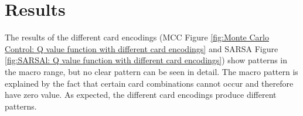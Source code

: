 
\chapter{Results} %

\label{Chapter4} %

The results of the different card encodings (MCC Figure \ref{fig:Monte Carlo Control: Q value function with different card encodings} and SARSA Figure \ref{fig:SARSAl: Q value function with different card encodings}) show patterns in the macro range, but no clear pattern can be seen in detail. The macro pattern is explained by the fact that certain card combinations cannot occur and therefore have zero value. As expected, the different card encodings produce different patterns. \\


